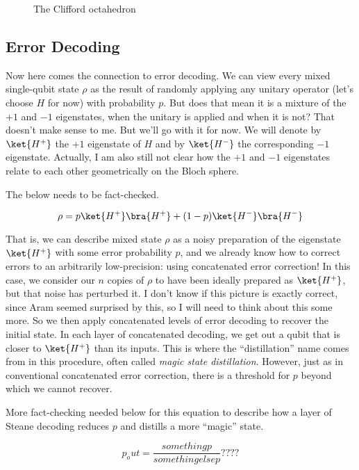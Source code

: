 \begin{figure}
\label{fig:clifford-octahedron}
\caption{The Clifford octahedron}
\end{figure}

\subsection{Error Decoding}

Now here comes the connection to error decoding. We can view every mixed
single-qubit state $\rho$ as the result of randomly applying any unitary
operator (let's choose $H$ for now) with probability $p$.
But does that mean it is a mixture of
the $+1$ and $-1$ eigenstates, when the unitary is applied and when it is not?
That doesn't make sense to me. But we'll go with it for now.
We will denote by $\ket{H^+}$ the $+1$ eigenstate of $H$ and by
$\ket{H^-}$ the corresponding $-1$ eigenstate. Actually, I am also still not
clear how the $+1$ and $-1$ eigenstates relate to each other geometrically
on the Bloch sphere.

The below needs to be fact-checked.

\begin{equation}
\rho = p\ket{H^+}\bra{H^+} + (1-p)\ket{H^-}\bra{H^-}
\end{equation}

That is, we can describe mixed state $\rho$ as a noisy preparation
of the eigenstate $\ket{H^+}$ with some error probability $p$, and we already
know how to correct errors to an arbitrarily low-precision: using
concatenated error correction! In this case, we consider our $n$ copies of
$\rho$ to have been ideally prepared as $\ket{H^+}$, but that noise has
perturbed it. I don't know if this picture is exactly correct, since Aram
seemed surprised by this, so I will need to think about this some more.
So we then apply concatenated levels of error decoding to
recover the initial state. In each layer of concatenated decoding, we get
out a qubit that is closer to $\ket{H^+}$ than its inputs. This is where
the ``distillation'' name comes from in this procedure, often called
\emph{magic state distillation}.
However, just as in conventional concatenated
error correction, there is a threshold for $p$ beyond which we cannot
recover.

More fact-checking needed below for this equation to describe how
a layer of Steane decoding reduces $p$ and distills a more ``magic'' state.

\begin{equation}
p_out = \frac{something p}{something else p} ????
\end{equation}

